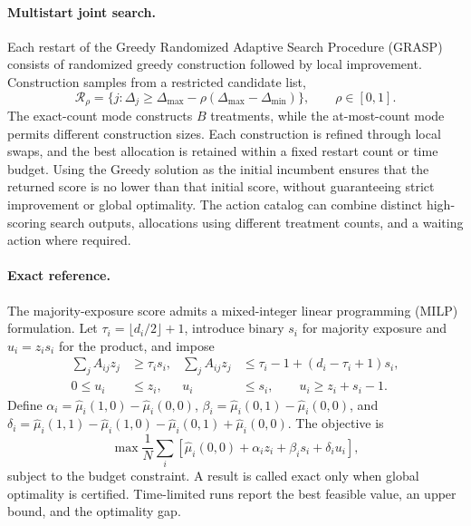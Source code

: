 \documentclass[a4paper,11pt]{article}
\numberwithin{equation}{section}
\begin{document}
\paragraph{Multistart joint search.}
Each restart of the Greedy Randomized Adaptive Search Procedure (GRASP)\citep{feo1995} consists of randomized greedy construction followed by local improvement. Construction samples from a restricted candidate list,
\begin{equation}
\mathcal R_\rho=\{j:\Delta_j\geq\Delta_{\max}-\rho(\Delta_{\max}-\Delta_{\min})\},\qquad \rho\in[0,1].
\end{equation}
The exact-count mode constructs $B$ treatments, while the at-most-count mode permits different construction sizes. Each construction is refined through local swaps, and the best allocation is retained within a fixed restart count or time budget. Using the Greedy solution as the initial incumbent ensures that the returned score is no lower than that initial score, without guaranteeing strict improvement or global optimality. The action catalog can combine distinct high-scoring search outputs, allocations using different treatment counts, and a waiting action where required.

\paragraph{Exact reference.}
The majority-exposure score admits a mixed-integer linear programming (MILP) formulation. Let $\tau_i=\lfloor d_i/2\rfloor+1$, introduce binary $s_i$ for majority exposure and $u_i=z_is_i$ for the product, and impose
\begin{align}
\sum_jA_{ij}z_j&\geq\tau_is_i,&
\sum_jA_{ij}z_j&\leq\tau_i-1+(d_i-\tau_i+1)s_i,\\
0\leq u_i&\leq z_i,&u_i&\leq s_i,\qquad u_i\geq z_i+s_i-1.
\end{align}
Define $\alpha_i=\widehat\mu_i(1,0)-\widehat\mu_i(0,0)$,
$\beta_i=\widehat\mu_i(0,1)-\widehat\mu_i(0,0)$, and
$\delta_i=\widehat\mu_i(1,1)-\widehat\mu_i(1,0)-\widehat\mu_i(0,1)+\widehat\mu_i(0,0)$. The objective is
\begin{equation}
\max\frac1N\sum_i[\widehat\mu_i(0,0)+\alpha_i z_i+\beta_i s_i+\delta_i u_i],
\end{equation}
subject to the budget constraint. A result is called exact only when global optimality is certified. Time-limited runs report the best feasible value, an upper bound, and the optimality gap.
\end{document}
